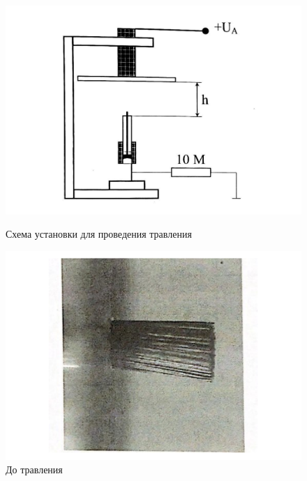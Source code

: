 \documentclass[a4paper]{article}
\begin{document}
\begin{enumerate}
\begin{itemize}
		\begin{figure}[H]
			\begin{center}
			\begin{minipage}[h]{0.33\linewidth}
				\includegraphics[width=1\linewidth]{p4.pdf}
				\caption{Схема установки для проведения травления}
				\label{default}
			\end{minipage}
			\begin{minipage}[h]{0.4\linewidth}
				\includegraphics[width=1\linewidth]{do.pdf}
				\caption{До травления} 
				\label{do}
			\end{minipage}
			\hfill 
			\begin{minipage}[h]{0.25\linewidth}

\end{minipage}
\end{center}
\end{figure}
\end{itemize}
\end{enumerate}
\end{document}
